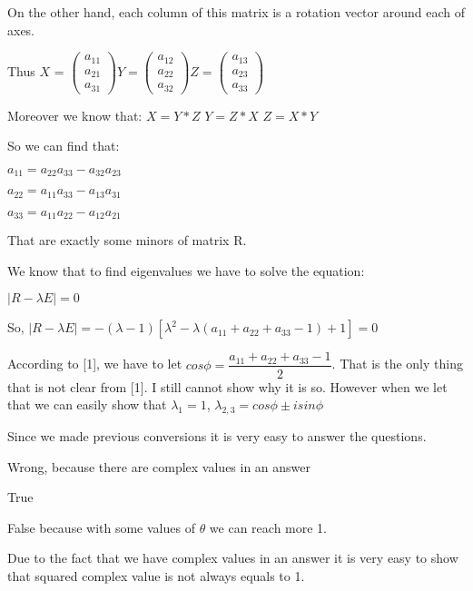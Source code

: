 \documentclass[12pt]{article}
\begin{document}
On the other hand, each column of this matrix is a rotation vector around each of axes.

Thus $X$ = $\left( \begin{array}{c}
a_{11} \\
a_{21} \\
a_{31} \end{array} \right)
Y = \left( \begin{array}{c}
a_{12} \\
a_{22} \\
a_{32} \end{array} \right)
Z = \left( \begin{array}{c}
a_{13} \\
a_{23} \\
a_{33} \end{array} \right)$

Moreover we know that:
$X = Y * Z$ 
$Y = Z * X$ 
$Z = X * Y$

So we can find that:

$a_{11} = a_{22} a_{33} - a_{32}a_{23}$

$a_{22} = a_{11} a_{33} - a_{13}a_{31}$ 

$a_{33} = a_{11} a_{22} - a_{12}a_{21}$ 

That are exactly some minors of matrix R. 

\medskip

We know that to find eigenvalues we have to solve the equation:

$\vert R - \lambda E \vert = 0$

So, $\vert R - \lambda E \vert = - (\lambda -1)[\lambda^2 - \lambda(a_{11} + a_{22} + a_{33} - 1) + 1] = 0$

According to [1], we have to let $cos \phi = \dfrac{a_{11}+ a_{22} + a_{33} - 1}{2}$. That is the only thing that is not clear from [1]. I still cannot show why it is so. However when we let that we can easily show that $\lambda_1 = 1$, $\lambda_{2,3}= cos \phi \pm i sin \phi$

Since we made previous conversions it is very easy to answer the questions.

\begin{list}{()~}{}
\item 
Wrong, because there are complex values in an answer
\item
True
\item
False because with some values of $\theta$ we can reach more 1.
\item
Due to the fact that we have complex values in an answer it is very easy to show that squared complex value is not always equals to 1.
\end{list}
\end{document}
